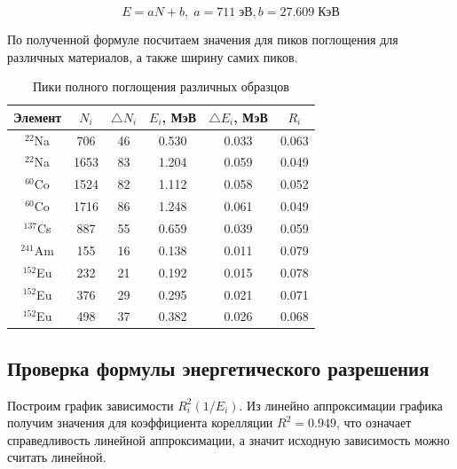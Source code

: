     \begin{equation}
        E = aN + b, \; a = 711 \; \text{эВ}, b = 27.609 \; \text{КэВ}
    \end{equation}

    По полученной формуле посчитаем значения для пиков поглощения для различных материалов, а также ширину самих пиков.

    \begin{table}[h!]
        \centering
        \caption{Пики полного поглощения различных образцов}
        \label{tab:peaks}
        \begin{tabular}{|c|c|c|c|c|c|}
            \hline
            Элемент & $N_i$ & $\triangle N_i$ & $E_i$, МэВ & $\triangle E_i$, МэВ & $R_i$  \\
            \hline
            $^{22}$Na & 706 & 46 & 0.530 & 0.033 & 0.063 \\
            \hline
            $^{22}$Na & 1653 & 83 & 1.204 & 0.059 & 0.049  \\
            \hline
            $^{60}$Co & 1524 & 82 & 1.112 & 0.058 & 0.052  \\
            \hline
            $^{60}$Co & 1716 & 86 & 1.248 & 0.061 & 0.049 \\
            \hline
            $^{137}$Cs & 887 & 55 & 0.659 & 0.039 & 0.059  \\
            \hline
            $^{241}$Am & 155 & 16 & 0.138 & 0.011 & 0.079  \\
            \hline
            $^{152}$Eu & 232 & 21 & 0.192 & 0.015 & 0.078 \\
            \hline
            $^{152}$Eu & 376 & 29 & 0.295 & 0.021 & 0.071  \\
            \hline
            $^{152}$Eu & 498 & 37 & 0.382 & 0.026 & 0.068 \\
            \hline
        \end{tabular}
    \end{table}

\subsection{Проверка формулы энергетического разрешения}
    
    Построим график зависимости $R_i^2(1/E_i)$. Из линейно аппроксимации графика получим значения для коэффициента корелляции $R^2 = 0.949$, что означает справедливость линейной аппроксимации, а значит исходную зависимость можно считать линейной.

